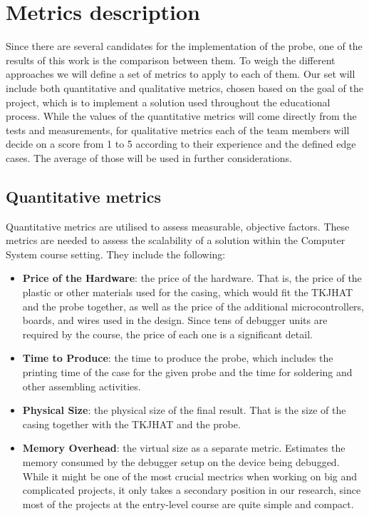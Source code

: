  \section{Metrics description}

Since there are several candidates for the implementation of the probe, one of the results of this work is the comparison between them. To weigh the different approaches we will define a set of metrics to apply to each of them. Our set will include both quantitative and qualitative metrics, chosen based on the goal of the project, which is to implement a solution used throughout the educational process. While the values of the quantitative metrics will come directly from the tests and measurements, for qualitative metrics each of the team members will decide on a score from 1 to 5 according to their experience and the defined edge cases. The average of those will be used in further considerations.

\subsection{Quantitative metrics}

Quantitative metrics are utilised to assess measurable, objective factors. These metrics are needed to assess the scalability of a solution within the Computer System course setting. They include the following:

\begin{itemize}
    \item \textbf{Price of the Hardware}: the price of the hardware. That is, the price of the plastic or other materials used for the casing, which would fit the TKJHAT and the probe together, as well as the price of the additional microcontrollers, boards, and wires used in the design. Since tens of debugger units are required by the course, the price of each one is a significant detail.
    
    \item \textbf{Time to Produce}: the time to produce the probe, which includes the printing time of the case for the given probe and the time for soldering and other assembling activities.   
    
    \item \textbf{Physical Size}: the physical size of the final result. That is the size of the casing together with the TKJHAT and the probe. 
    
    \item \textbf{Memory Overhead}: the virtual size as a separate metric. Estimates the memory consumed by the debugger setup on the device being debugged. While it might be one of the most crucial mectrics when working on big and complicated projects, it only takes a secondary position in our research, since most of the projects at the entry-level course are quite simple and compact.
    
\end{itemize}

